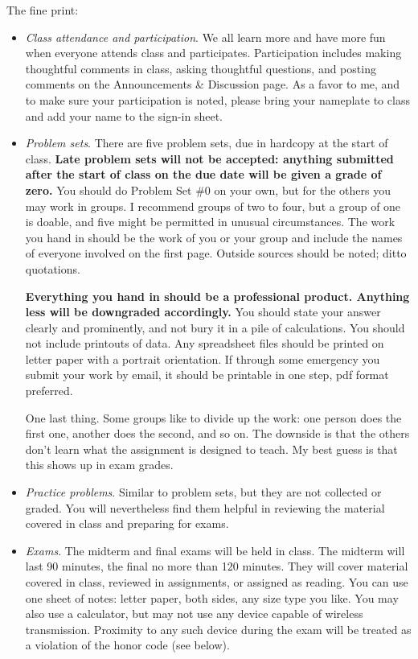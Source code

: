 \documentclass[12pt]{article}
\begin{document}
The fine print:
\begin{itemize}

\item \textit{Class attendance and participation}.
We all learn more and have more fun when everyone attends class and participates.
Participation includes making thoughtful comments in class,
asking thoughtful questions,
and posting comments on the Announcements \& Discussion page.
As a favor to me, and to make sure your participation is noted,
please bring your nameplate to class and add your name to the
sign-in sheet.

\item \textit{Problem sets}.
There are five problem sets,
due in hardcopy at the start of class.
{\bf Late problem sets will not be accepted:
anything submitted after the start of class on the due date will be given a grade of zero.}
You should do Problem Set \#0 on your own,
but for the others you may work in groups.
I recommend groups of two to four,
but a group of one is doable, and five might be permitted in unusual circumstances.
The work you hand in should be the work of you or your group
and include the names of everyone involved on the first page.
Outside sources should be noted; ditto quotations.

{\bf Everything you hand in should be a  professional product.
Anything less will be downgraded accordingly.}
You should state your answer clearly and prominently,
and not bury it in a pile of calculations.
You should not include printouts of data.
Any spreadsheet files should be printed on letter paper
with a portrait orientation.
If through some emergency you submit your work by email,
it should be printable in one step,
pdf format preferred.

One last thing.  Some groups like to divide up the work:
one person does the first one, another does the second, and so on.
The downside is that the others don't learn what the assignment is designed
to teach.
My best guess is that this shows up in exam grades.


\item \textit{Practice problems}.
Similar to problem sets, but they are not collected or graded.
You will nevertheless find them helpful in reviewing the
material covered in class and preparing for exams.


\item \textit{Exams}.
The midterm and final exams will be held in class.
The midterm will last 90 minutes, the final no more than 120 minutes.
They will cover material covered in class, reviewed in assignments,
or assigned as reading.
You can use one sheet of notes: letter paper, both sides, any size type you like.
You may also use a calculator, but may not use any device
capable of wireless transmission.  Proximity to any such
device during the exam will be treated as a violation of the honor
code (see below).


\end{itemize}
\end{document}
